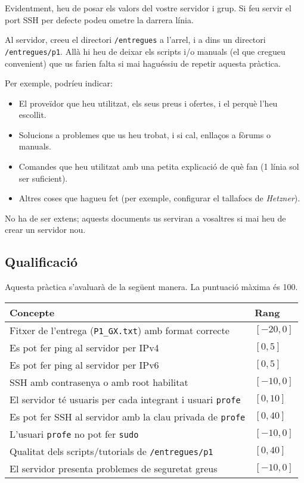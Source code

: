\documentclass{practicaitic}
\begin{document}
Evidentment, heu de posar els valors del vostre servidor i grup. Si feu
servir el port SSH per defecte podeu ometre la darrera línia.

Al servidor, creeu el directori \texttt{/entregues} a l'arrel, i a dins un
directori \texttt{/entregues/p1}. Allà hi heu de deixar els scripts i/o manuals
(el que cregueu convenient) que us farien falta si mai haguéssiu de repetir
aquesta pràctica.

Per exemple, podríeu indicar:
\begin{itemize}
  \item El proveïdor que heu utilitzat, els seus preus i ofertes, i el perquè l'heu escollit.
  \item Solucions a problemes que us heu trobat, i si cal, enllaços a fòrums o manuals.
  \item Comandes que heu utilitzat amb una petita explicació de què fan (1 línia sol ser suficient).
  \item Altres coses que hagueu fet (per exemple, configurar el tallafocs de \textit{Hetzner}).
\end{itemize}

No ha de ser extens; aquests documents us serviran a vosaltres si mai heu de
crear un servidor nou.

\subsection{Qualificació}

Aquesta pràctica s'avaluarà de la següent manera. La puntuació màxima és 100.

\begin{center}
  \begin{tabular}{ll}
  \hline
  Concepte & Rang \\ \hline
  Fitxer de l'entrega (\texttt{P1\_GX.txt}) amb format correcte & $[-20, 0]$ \\
  Es pot fer ping al servidor per IPv4 & $[0, 5]$ \\
  Es pot fer ping al servidor per IPv6 & $[0, 5]$ \\
  SSH amb contrasenya o amb root habilitat & $[-10, 0]$ \\
  El servidor té usuaris per cada integrant i usuari \texttt{profe} & $[0, 10]$ \\
  Es pot fer SSH al servidor amb la clau privada de \texttt{profe} & $[0, 40]$ \\
  L'usuari \texttt{profe} no pot fer \texttt{sudo} & $[-10,0]$ \\
  Qualitat dels scripts/tutorials de \texttt{/entregues/p1} & $[0,40]$ \\
  El servidor presenta problemes de seguretat greus & $[-10,0]$ \\
  \hline
  \end{tabular}
\end{center}
\end{document}
